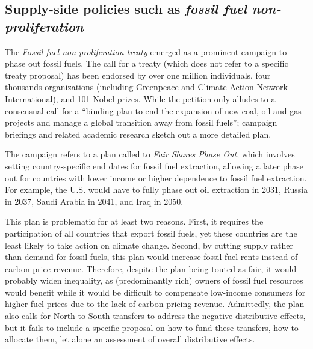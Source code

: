 \documentclass[12pt,english]{article}
\begin{document}
\subsection{Supply-side policies such as \textit{fossil fuel non-proliferation}}

The \textit{Fossil-fuel non-proliferation treaty} emerged as a prominent campaign to phase out fossil fuels. The call for a treaty (which does not refer to a specific treaty proposal) has been endorsed by over one million individuals, four thousands organizations (including Greenpeace and Climate Action Network International), and 101 Nobel prizes. While the petition only alludes to a consensual call for a ``binding plan to end the expansion of new coal, oil and gas projects and manage a global transition away from fossil fuels''; campaign briefings and related academic research sketch out a more detailed plan.\citep{civil_society_equity_review_fair_2021,civil_society_equity_review_equitable_2023,calverley_phaseout_2022,fossil_fuel_non-proliferation_treaty_global_2023}

The campaign refers to a plan called to \textit{Fair Shares Phase Out}, which involves setting country-specific end dates for fossil fuel extraction,\citep{civil_society_equity_review_equitable_2023,calverley_phaseout_2022} allowing a later phase out for countries with lower income or higher dependence to fossil fuel extraction. For example, the U.S. would have to fully phase out oil extraction in 2031, Russia in 2037, Saudi Arabia in 2041, and Iraq in 2050.

This plan is problematic for at least two reasons. First, it requires the participation of all countries that export fossil fuels, yet these countries are the least likely to take action on climate change. Second, by cutting supply rather than demand for fossil fuels, this plan would increase fossil fuel rents instead of carbon price revenue. Therefore, despite the plan being touted as fair, it would probably widen inequality, as (predominantly rich) owners of fossil fuel resources would benefit while it would be difficult to compensate low-income consumers for higher fuel prices due to the lack of carbon pricing revenue. Admittedly, the plan also calls for North-to-South transfers to address the negative distributive effects, but it fails to include a specific proposal on how to fund these transfers, how to allocate them, let alone an assessment of overall distributive effects. 
\end{document}
